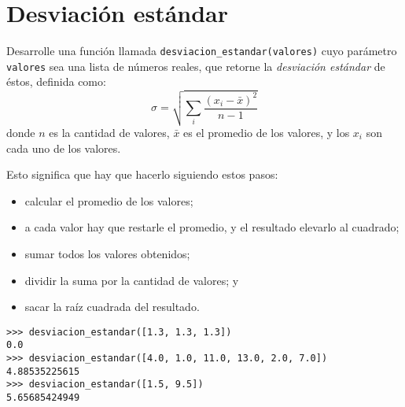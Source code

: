 \section{Desviación estándar}

Desarrolle una función llamada \lstinline!desviacion_estandar(valores)!
cuyo parámetro \lstinline!valores! sea una lista de números reales,
que retorne la \emph{desviación estándar} de éstos,
definida como:
\[\sigma = \sqrt{\sum_{i} \frac{(x_i - \bar{x})^2}{n - 1}}\]
donde \(n\) es la cantidad de valores, \(\bar{x}\) es el promedio de los
valores, y los \(x_i\) son cada uno de los valores.

Esto significa que hay que hacerlo siguiendo estos pasos:

\begin{itemize}
\item
  calcular el promedio de los valores;
\item
  a cada valor hay que restarle el promedio, y el resultado elevarlo al
  cuadrado;
\item
  sumar todos los valores obtenidos;
\item
  dividir la suma por la cantidad de valores; y
\item
  sacar la raíz cuadrada del resultado.
\end{itemize}

\begin{lstlisting}
>>> desviacion_estandar([1.3, 1.3, 1.3])
0.0
>>> desviacion_estandar([4.0, 1.0, 11.0, 13.0, 2.0, 7.0])
4.88535225615
>>> desviacion_estandar([1.5, 9.5])
5.65685424949
\end{lstlisting}

